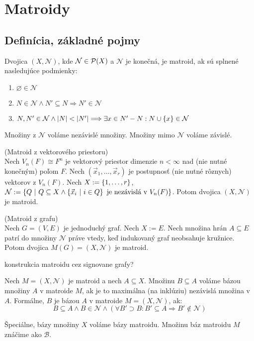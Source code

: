 \chapter{Matroidy}

\section{Definícia, základné pojmy}

\begin{definition}

Dvojica $(X, \mathcal{N})$, kde $\mathcal{N} \in \mathcal{P}(X)$ a $\mathcal{N}$ je konečná, je matroid, ak sú splnené nasledujúce podmienky:
\begin{enumerate}
    \item $\varnothing \in \mathcal{N}$
    \item $N \in \mathcal{N} \wedge N' \subseteq N \Longrightarrow N' \in \mathcal{N}$
    \item $N, N' \in \mathcal{N} \wedge \left|N\right| < \left|N'\right| \Longrightarrow \exists x \in N' - N: N \cup \left\{x\right\} \in \mathcal{N}$
\end{enumerate}

Množiny z $\mathcal{N}$ voláme nezávislé množiny. Množiny mimo $\mathcal{N}$ voláme závislé.
\end{definition}

\begin{theorem}{(Matroid z vektorového priestoru)}\\
Nech $V_n(F) \cong F^n$ je vektorový priestor dimenzie $n < \infty$ nad (nie nutné konečným) poľom $F$. 
Nech $(\vec{x}_1, \ldots, \vec{x}_r)$ je postupnosť (nie nutné rôznych) vektorov z $V_n(F)$.
Nech $X := \left\{1, \ldots, r\right\}$, $\mathcal{N} := \left\{Q ~|~ Q \subseteq X \wedge \left\{\vec{x}_i ~|~ i \in Q\right\} \text{ je nezávislá v } V_n(F) \right\}$.
Potom dvojica $(X, \mathcal{N})$ je matroid.
\end{theorem}

\begin{theorem}{(Matroid z grafu)}\\
Nech $G = (V, E)$ je jednoduchý graf. Nech $X := E$. Nech množina hrán $A \subseteq E$ patrí do množiny $\mathcal{N}$ práve vtedy, keď
indukovaný graf neobsahuje kružnice. Potom dvojica $M(G) = (X, \mathcal{N})$ je matroid.
\end{theorem}

\TODO konstrukcia matroidu cez signovane grafy?

\begin{definition}
Nech $M = (X, \mathcal{N})$ je matroid a nech $A \subseteq X$. Množinu $B \subseteq A$ voláme bázou množiny $A$ v matroide $M$, ak 
je to maximálna (na inklúziu) nezávislá množina v $A$. Formálne, $B$ je bázou $A$ v matroide $M=(X, \mathcal{N})$, ak:
$$B \subseteq A \wedge B \in \mathcal{N} \wedge \left( \forall B' \supset B: B' \subseteq A \Longrightarrow B' \not\in\mathcal{N} \right)$$

Špeciálne, bázy množiny $X$ voláme bázy matroidu. Množinu báz matroidu $M$ znáčime ako $\mathcal{B}$.
\end{definition}

